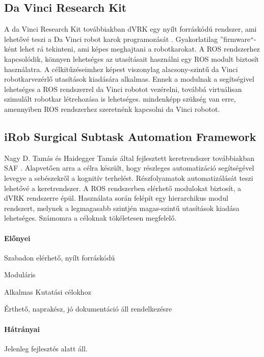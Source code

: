 \documentclass[12pt,a4paper,oneside]{report} %
\begin{document}
\subsection{Da Vinci Research Kit}
\label{davinci}
A da Vinci Research Kit továbbiakban dVRK egy nyílt forráskódú rendszer, ami lehetővé teszi a Da Vinci robot karok programozását \cite{kazanzides2014open}. Gyakorlatilag ''firmware``-ként lehet rá tekinteni, ami képes meghajtani a robotkarokat.  A ROS rendszerhez kapcsolódik, könnyen lehetséges az utasításait használni egy ROS  modult biztosít használatra.  A célkitűzéseimhez képest viszonylag alacsony-szintű da Vinci robotkarvezérlő utasítások kiadására alkalmas.
Ennek a modulnak a segítségivel lehetséges a ROS rendszerrel da Vinci robotot vezérelni, továbbá virtuálisan szimulált robotkar létrehozása is lehetséges. mindenképp szükség van erre, amennyiben ROS rendszerhez szeretnénk kapcsolni da Vinci robotot. 
\subsection{iRob Surgical Subtask Automation Framework}
\label{irob}
Nagy D. Tamás és Haidegger Tamás által fejlesztett keretrendszer továbbiakban SAF \cite{irobsaf2019}.
Alapvetően arra a célra készült, hogy részleges automatizáció segítségével levegye a sebészekről a kognitív terhelést. Részfolyamatok automatizálását teszi lehetővé a keretrendszer. A ROS rendszerben elérhető modulokat biztosít, a dVRK rendszerre épül. Használata során felépít egy hierarchikus modul rendszert, melynek a legmagasabb szintjén magas-szintű utasítások kiadása lehetséges. Számomra a céloknak tökéletesen megfelelő.
\paragraph{Előnyei} 
\begin{compactitem}
	\item Szabadon elérhető, nyílt forráskódú
	\item Moduláris
	\item Alkalmas Kutatási célokhoz
	\item Érthető, naprakész, jó dokumentáció áll rendelkezésre
\end{compactitem}
\paragraph{Hátrányai} 
\begin{compactitem}
	\item Jelenleg fejlesztés alatt áll.
\end{compactitem}
\end{document}
